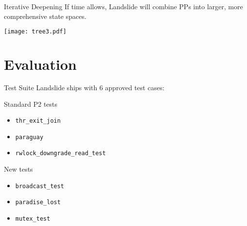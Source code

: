 \documentclass[xcolor=dvipsnames]{beamer}
\begin{document}
\begin{frame}{Iterative Deepening}
	If time allows, Landslide will combine PPs into larger, more comprehensive state spaces.
	\begin{center}
		\texttt{[image: tree3.pdf]}
	\end{center}
\end{frame}


\section{Evaluation}


\begin{frame}{Test Suite}
	Landslide ships with 6 approved test cases:
	\linegap

	Standard P2 tests
	\begin{itemize}
		\item {\tt thr\_exit\_join}
		\item {\tt paraguay}
		\item {\tt rwlock\_downgrade\_read\_test}
	\end{itemize}

	New tests
	\begin{itemize}
		\item {\tt broadcast\_test}
		\item {\tt paradise\_lost} %
		\item {\tt mutex\_test} %
	\end{itemize}
\end{frame}
\end{document}

